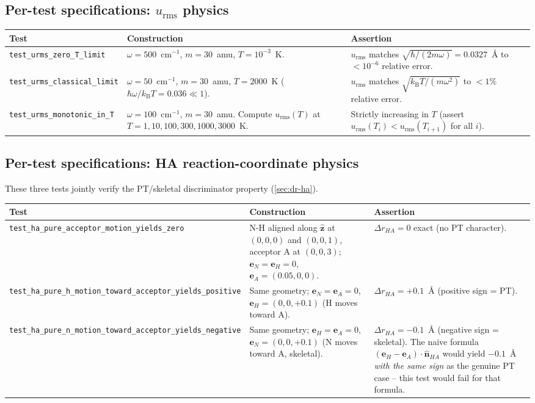 \documentclass[10pt,a4paper,twoside]{article}
\newcommand{\evec}{\mathbf{e}}
\newcommand{\zhat}{\hat{\mathbf{z}}}
\newcommand{\nhat}{\hat{\mathbf{n}}}
\newcommand{\kB}{k_{\mathrm{B}}}
\newcommand{\urms}{u_{\mathrm{rms}}}
\begin{document}
\subsection{Per-test specifications: $\urms$ physics}

\begin{longtable}{p{} p{} p{}}
\toprule
\textbf{Test} & \textbf{Construction} & \textbf{Assertion} \\
\midrule
\texttt{test\_urms\_zero\_T\_limit}
 & $\omega = 500$~cm$^{-1}$, $m = 30$~amu, $T = 10^{-3}$~K.
 & $\urms$ matches $\sqrt{\hbar/(2 m\omega)} = 0.0327$~\AA{}
   to $< 10^{-6}$ relative error. \\
\midrule
\texttt{test\_urms\_classical\_limit}
 & $\omega = 50$~cm$^{-1}$, $m = 30$~amu, $T = 2000$~K
   ($\hbar\omega/\kB T = 0.036 \ll 1$).
 & $\urms$ matches $\sqrt{\kB T/(m\omega^2)}$ to $< 1\%$ relative
   error. \\
\midrule
\texttt{test\_urms\_monotonic\_in\_T}
 & $\omega = 100$~cm$^{-1}$, $m = 30$~amu. Compute $\urms(T)$ at
   $T = 1, 10, 100, 300, 1000, 3000$~K.
 & Strictly increasing in $T$ (assert
   $\urms(T_i) < \urms(T_{i+1})$ for all $i$). \\
\bottomrule
\end{longtable}

\subsection{Per-test specifications: HA reaction-coordinate physics}

These three tests jointly verify the PT/skeletal discriminator
property (\cref{sec:dr-ha}).

\begin{longtable}{p{} p{} p{}}
\toprule
\textbf{Test} & \textbf{Construction} & \textbf{Assertion} \\
\midrule
\texttt{test\_ha\_pure\_acceptor\_motion\_yields\_zero}
 & N-H aligned along $\zhat$ at $(0,0,0)$ and $(0,0,1)$,
   acceptor A at $(0,0,3)$; $\evec_N = \evec_H = 0$,
   $\evec_A = (0.05, 0, 0)$.
 & $\Delta r_{HA} = 0$ exact (no PT character). \\
\midrule
\texttt{test\_ha\_pure\_h\_motion\_toward\_acceptor\_yields\_positive}
 & Same geometry; $\evec_N = \evec_A = 0$,
   $\evec_H = (0, 0, +0.1)$ (H moves toward A).
 & $\Delta r_{HA} = +0.1$~\AA{} (positive sign = PT). \\
\midrule
\texttt{test\_ha\_pure\_n\_motion\_toward\_acceptor\_yields\_negative}
 & Same geometry; $\evec_H = \evec_A = 0$,
   $\evec_N = (0, 0, +0.1)$ (N moves toward A, skeletal).
 & $\Delta r_{HA} = -0.1$~\AA{} (negative sign = skeletal).
   The naive formula $(\evec_H - \evec_A)\cdot\nhat_{HA}$ would
   yield $-0.1$~\AA{} \emph{with the same sign} as the genuine PT
   case -- this test would fail for that formula. \\
\bottomrule
\end{longtable}
\end{document}
